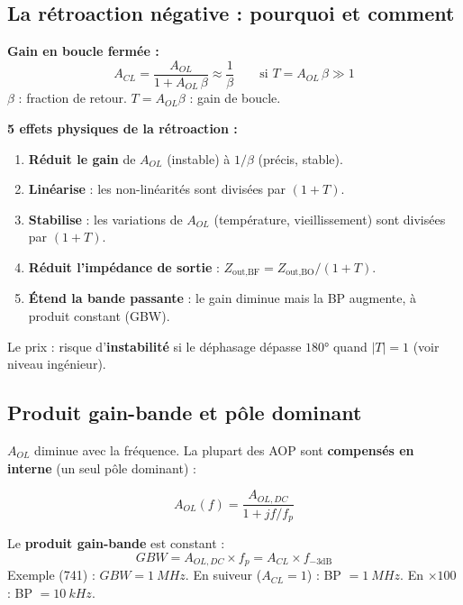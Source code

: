 \documentclass[12pt,a4paper,twoside]{book}
\begin{document}
\subsection{La rétroaction négative : pourquoi et comment}

\begin{formule}
\textbf{Gain en boucle fermée :}
\[
\boxed{A_{CL} = \frac{A_{OL}}{1 + A_{OL}\,\beta} \approx \frac{1}{\beta}} \qquad \text{si } T = A_{OL}\,\beta \gg 1
\]
$\beta$ : fraction de retour. $T = A_{OL}\beta$ : gain de boucle.
\end{formule}

\begin{intuition}
\textbf{5 effets physiques de la rétroaction :}
\begin{enumerate}[nosep]
\item \textbf{Réduit le gain} de $A_{OL}$ (instable) à $1/\beta$ (précis, stable).
\item \textbf{Linéarise} : les non-linéarités sont divisées par $(1+T)$.
\item \textbf{Stabilise} : les variations de $A_{OL}$ (température, vieillissement) sont divisées par $(1+T)$.
\item \textbf{Réduit l'impédance de sortie} : $Z_{\text{out,BF}} = Z_{\text{out,BO}}/(1+T)$.
\item \textbf{Étend la bande passante} : le gain diminue mais la BP augmente, à produit constant (GBW).
\end{enumerate}
Le prix : risque d'\textbf{instabilité} si le déphasage dépasse $180°$ quand $|T| = 1$ (voir niveau ingénieur).
\end{intuition}

\subsection{Produit gain-bande et pôle dominant}

$A_{OL}$ diminue avec la fréquence. La plupart des AOP sont \textbf{compensés en interne} (un seul pôle dominant) :

\begin{formule}
\[
A_{OL}(f) = \frac{A_{OL,DC}}{1 + jf/f_p}
\]

Le \textbf{produit gain-bande} est constant :
\[
\boxed{GBW = A_{OL,DC} \times f_p = A_{CL} \times f_{-3\text{dB}}}
\]
Exemple (741) : $GBW = \SI{1}{MHz}$. En suiveur ($A_{CL} = 1$) : BP $= \SI{1}{MHz}$. En $\times 100$ : BP $= \SI{10}{kHz}$.
\end{formule}
\end{document}
